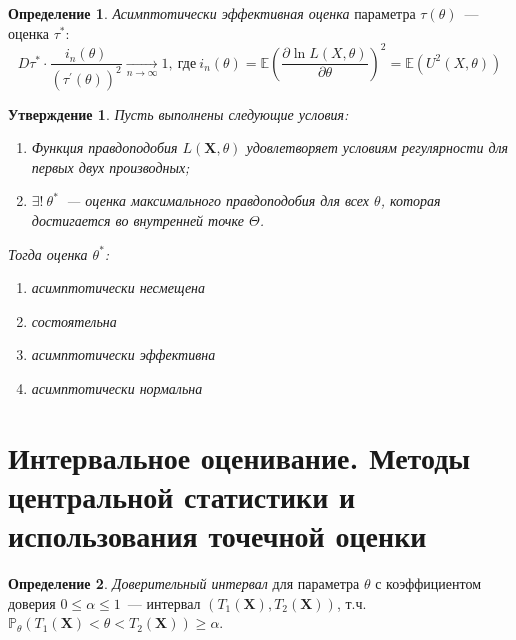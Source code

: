 \documentclass[oneside,final,14pt]{extreport}
\theoremstyle{plain}
\newtheorem*{thm*}{Утверждение}
\theoremstyle{definition}
\newtheorem*{defn}{Определение}
\theoremstyle{named}
\begin{document}
\begin{defn}
    {\it Асимптотически эффективная оценка} параметра $\tau(\theta)$~--- оценка $\tau^{*}$:
    \begin{equation*}
        D \tau^{*} \cdot \frac{i_{n}(\theta)}{\left(\tau^{\prime}(\theta)\right)^{2}} \xrightarrow[n \to \infty]{} 1,~ \text{где}~ i_{n}(\theta)=\mathbb{E}\left(\frac{\partial \ln L(X, \theta)}{\partial \theta}\right)^{2} = \mathbb{E}(U^{2}(X, \theta))
    \end{equation*}
\end{defn}

\begin{thm*}
    Пусть выполнены следующие условия:
    \begin{enumerate}
        \item Функция правдоподобия $L(\mathbf{X}, \theta)$ удовлетворяет условиям регулярности для первых двух производных;
        \item $\exists!~ \theta^{*}$~--- оценка максимального правдоподобия для всех $\theta$, которая достигается во внутренней точке $\Theta$.
    \end{enumerate}
    Тогда оценка $\theta^{*}$:
    \begin{enumerate}
        \item асимптотически несмещена
        \item состоятельна
        \item асимптотически эффективна
        \item асимптотически нормальна
    \end{enumerate}
\end{thm*}

\section{Интервальное оценивание. Методы центральной статистики и использования точечной оценки}

\begin{defn}
{\it Доверительный интервал} для параметра $\theta$ с коэффициентом доверия $0 \leqslant \alpha \leqslant 1$~--- интервал $(T_1(\mathbf{X}), T_2(\mathbf{X}))$, т.ч. $\mathbb{P}_{\theta}(T_1(\mathbf{X}) < \theta < T_2(\mathbf{X})) \geqslant \alpha$.
\end{defn}
\end{document}
